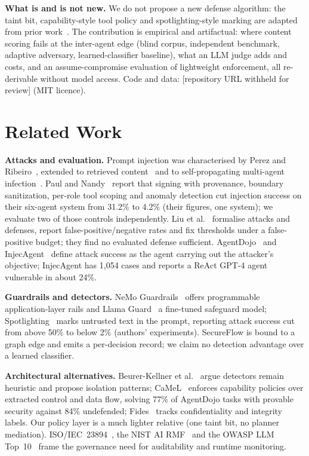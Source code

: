 \documentclass[conference]{IEEEtran}
\newcommand{\repourl}{[repository URL withheld for review]}
\newcommand{\repourl}{\url{https://github.com/piyushrajyadav/Secure-Flow}}
\begin{document}
\textbf{What is and is not new.} We do not propose a new defense algorithm: the taint
bit, capability-style tool policy and spotlighting-style marking are adapted from
prior work~\cite{debenedetti2025camel, costa2025fides, hines2024spotlighting}. The
contribution is empirical and artifactual: where content scoring fails at the
inter-agent edge (blind corpus, independent benchmark, adaptive adversary,
learned-classifier baseline), what an LLM judge adds and costs, and an
assume-compromise evaluation of lightweight enforcement, all re-derivable without
model access. Code and data: \repourl{} (MIT licence).

\section{Related Work}

\textbf{Attacks and evaluation.} Prompt injection was characterised by Perez and
Ribeiro~\cite{perez2022ignore}, extended to retrieved content~\cite{greshake2023indirect}
and to self-propagating multi-agent infection~\cite{lee2024infection}. Paul and
Nandy~\cite{paul2026beyond} report that signing with provenance, boundary
sanitization, per-role tool scoping and anomaly detection cut injection success on
their six-agent system from 31.2\% to 4.2\% (their figures, one system); we evaluate
two of those controls independently. Liu et al.~\cite{liu2024formalizing} formalise
attacks and defenses, report false-positive/negative rates and fix thresholds under a
false-positive budget; they find no evaluated defense sufficient. AgentDojo~\cite{debenedetti2024agentdojo}
and InjecAgent~\cite{zhan2024injecagent} define attack success as the agent carrying
out the attacker's objective; InjecAgent has 1{,}054 cases and reports a ReAct GPT-4
agent vulnerable in about 24\%.

\textbf{Guardrails and detectors.} NeMo Guardrails~\cite{rebedea2023nemo} offers
programmable application-layer rails and Llama Guard~\cite{inan2023llamaguard} a
fine-tuned safeguard model; Spotlighting~\cite{hines2024spotlighting} marks untrusted
text in the prompt, reporting attack success cut from above 50\% to below 2\% (authors'
experiments). SecureFlow is bound to a graph edge and emits a per-decision record; we
claim no detection advantage over a learned classifier.

\textbf{Architectural alternatives.} Beurer-Kellner et al.~\cite{beurerkellner2025patterns}
argue detectors remain heuristic and propose isolation patterns; CaMeL~\cite{debenedetti2025camel}
enforces capability policies over extracted control and data flow, solving 77\% of
AgentDojo tasks with provable security against 84\% undefended; Fides~\cite{costa2025fides}
tracks confidentiality and integrity labels. Our policy layer is a much lighter
relative (one taint bit, no planner mediation). ISO/IEC~23894~\cite{iso23894}, the NIST
AI RMF~\cite{nist2023airmf} and the OWASP LLM Top~10~\cite{owasp2025} frame the
governance need for auditability and runtime monitoring.
\end{document}
